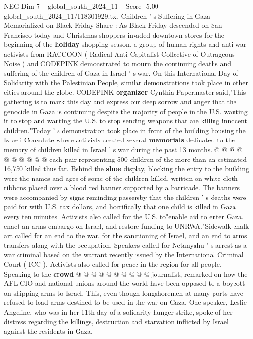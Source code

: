\begin{textsample}{NEG Dim 7 – global\_south\_2024\_11 – Score -5.00 – global\_south\_2024\_11/118301929.txt}  \label{ex:f7_neg_432}
Children ' s Suffering in Gaza Memorialized on Black Friday Share : As Black Friday descended on San Francisco today and Christmas shoppers invaded downtown stores for the beginning of the \textbf{holiday} shopping season, a group of human rights and anti-war activists from RACCOON ( Radical Anti-Capitalist Collective of Outrageous Noise ) and CODEPINK demonstrated to mourn the continuing deaths and suffering of the children of Gaza in Israel ' s war.
On this International Day of Solidarity with the Palestinian People, similar demonstrations took place in other cities around the globe.
CODEPINK \textbf{organizer} Cynthia Papermaster said,"This gathering is to mark this day and express our deep sorrow and anger that the genocide in Gaza is continuing despite the majority of people in the U.S. wanting it to stop and wanting the U.S. to stop sending weapons that are killing innocent children."Today ' s demonstration took place in front of the building housing the Israeli Consulate where activists created several \textbf{memorials} dedicated to the memory of children killed in Israel ' s war during the past 13 months. @ @ @ @ @ @ @ @ @ @ each pair representing 500 children of the more than an estimated 16,750 killed thus far.
Behind the \textbf{shoe} display, blocking the entry to the building were the names and ages of some of the children killed, written on white cloth ribbons placed over a blood red banner supported by a barricade.
The banners were accompanied by signs reminding passersby that the children ' s deaths were paid for with U.S. tax dollars, and horrifically that one child is killed in Gaza every ten minutes.
Activists also called for the U.S. to"enable aid to enter Gaza, enact an arms embargo on Israel, and restore funding to UNRWA."Sidewalk chalk art called for an end to the war, for the sanctioning of Israel, and an end to arms transfers along with the occupation.
Speakers called for Netanyahu ' s arrest as a war criminal based on the warrant recently issued by the International Criminal Court ( ICC ).
Activists also called for peace in the region for all people.
Speaking to the \textbf{crowd} @ @ @ @ @ @ @ @ @ @ journalist, remarked on how the AFL-CIO and national unions around the world have been opposed to a boycott on shipping arms to Israel.
This, even though longshoremen at many ports have refused to load arms destined to be used in the war on Gaza.
One speaker, Leslie Angeline, who was in her 11th day of a solidarity hunger strike, spoke of her distress regarding the killings, destruction and starvation inflicted by Israel against the residents in Gaza.

\end{textsample}
